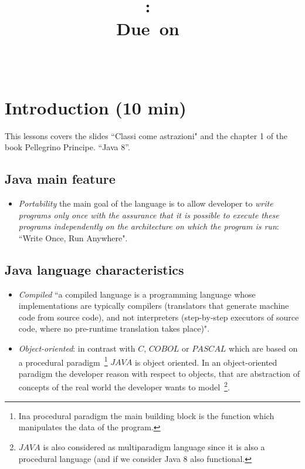 \documentclass{article}
\title{
\vspace{2in}
\textmd{\textbf{\hmwkClass:\ \hmwkTitle}}\\
\normalsize\vspace{0.1in}\small{Due\ on\ \hmwkDueDate}\\
\vspace{0.1in}\large{\textit{\hmwkClassInstructor\ \hmwkClassTime}}
\vspace{3in}
}
\author{\textbf{\hmwkAuthorName}}
\date{} %
\theoremstyle{definition}
\begin{document}
\maketitle



\newpage
\tableofcontents
\newpage



\section{Introduction (10 min)}
This lessons covers the slides ``Classi come astrazioni" and the chapter 1 of the book  Pellegrino Principe. “Java 8”.
\subsection{Java main feature}
\begin{itemize}
\item \emph{Portability} the main goal of the language is to allow developer to \emph{write programs only once with the assurance that it is possible to execute these programs independently on the architecture on which the program is run}: ``Write Once, Run Anywhere".
\end{itemize}

\subsection{Java language characteristics}
\begin{itemize}
\item \emph{Compiled} ``a compiled language is a programming language whose implementations are typically compilers (translators that generate machine code from source code), and not interpreters (step-by-step executors of source code, where no pre-runtime translation takes place)"\cite{WikipediaCompiled}.
\item \emph{Object-oriented}: in contrast with $C$, $COBOL$ or $PASCAL$ which are based on a procedural paradigm~\footnote{Ina procedural paradigm the main building block is the function which manipulates the data of the program.} $JAVA$ is object oriented. In an object-oriented paradigm the developer reason with respect to objects, that are abstraction of concepts of the real world the developer wants to model~\footnote{$JAVA$ is also considered as multiparadigm language since it is also a procedural language (and if we consider Java 8 also functional.}.
\end{itemize}
\end{document}
